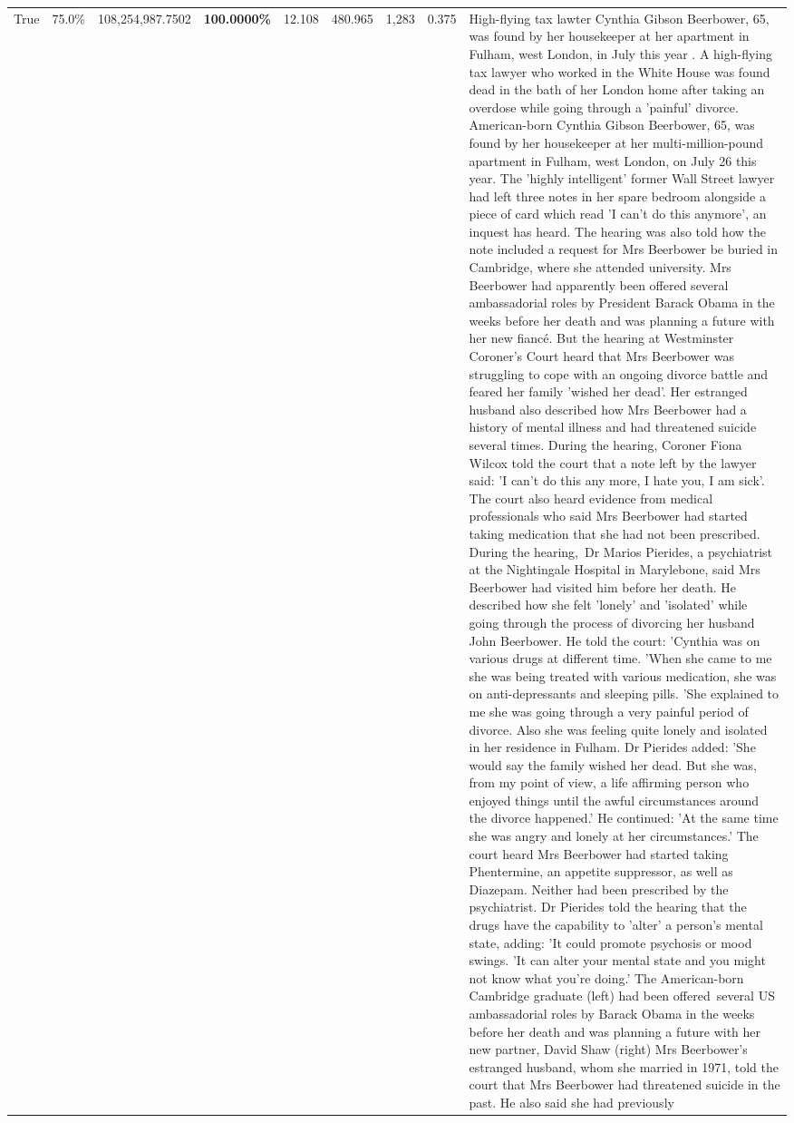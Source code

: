 \begin{table}[H]
\begin{tabular}{lllrlllll}
\cline{1-9}
True & 75.0\% & 108,254,987.7502 & \bfseries \color{red} 100.0000\% & 12.108 & 480.965 & 1,283 & 0.375 & High-flying tax lawter Cynthia Gibson Beerbower, 65, was found by her housekeeper at her apartment in Fulham, west London, in July this year . A high-flying tax lawyer who worked in the White House was found dead in the bath of her London home after taking an overdose while going through a 'painful' divorce. American-born Cynthia Gibson Beerbower, 65, was found by her housekeeper at her multi-million-pound apartment in Fulham, west London, on July 26 this year. The 'highly intelligent' former Wall Street lawyer had left three notes in her spare bedroom alongside a piece of card which read 'I can't do this anymore', an inquest has heard. The hearing was also told how the note included a request for Mrs Beerbower be buried in Cambridge, where she attended university. Mrs Beerbower had apparently been offered several ambassadorial roles by President Barack Obama in the weeks before her death and was planning a future with her new fiancé. But the hearing at Westminster Coroner's Court heard that Mrs Beerbower was struggling to cope with an ongoing divorce battle and feared her family 'wished her dead'. Her estranged husband also described how Mrs Beerbower had a history of mental illness and had threatened suicide several times. During the hearing, Coroner Fiona Wilcox told the court that a note left by the lawyer said: 'I can't do this any more, I hate you, I am sick'. The court also heard evidence from medical professionals who said Mrs Beerbower had started taking medication that she had not been prescribed. During the hearing, Dr Marios Pierides, a psychiatrist at the Nightingale Hospital in Marylebone, said Mrs Beerbower had visited him before her death. He described how she felt 'lonely' and 'isolated' while going through the process of divorcing her husband John Beerbower. He told the court: 'Cynthia was on various drugs at different time. 'When she came to me she was being treated with various medication, she was on anti-depressants and sleeping pills. 'She explained to me she was going through a very painful period of divorce. Also she was feeling quite lonely and isolated in her residence in Fulham. Dr Pierides added: 'She would say the family wished her dead. But she was, from my point of view, a life affirming person who enjoyed things until the awful circumstances around the divorce happened.' He continued: 'At the same time she was angry and lonely at her circumstances.' The court heard Mrs Beerbower had started taking Phentermine, an appetite suppressor, as well as Diazepam. Neither had been prescribed by the psychiatrist. Dr Pierides told the hearing that the drugs have the capability to 'alter' a person's mental state, adding: 'It could promote psychosis or mood swings. 'It can alter your mental state and you might not know what you're doing.' The American-born Cambridge graduate (left) had been offered several US ambassadorial roles by Barack Obama in the weeks before her death and was planning a future with her new partner, David Shaw (right) Mrs Beerbower's estranged husband, whom she married in 1971, told the court that Mrs Beerbower had threatened suicide in the past. He also said she had previously 
\end{tabular}
\end{table}
